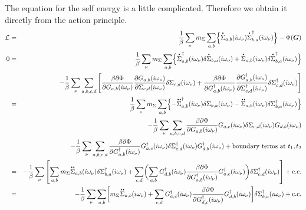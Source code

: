 \documentclass[11pt,a4paper]{report}
\begin{document}
The equation for the self energy is a little complicated. Therefore we
obtain it directly from the action principle.
\begin{eqnarray*}
\mathcal{L}&=&\frac{1}{\beta}\sum_\nu m_\Sigma
\sum_{a,b}\Bigl\lbrace
\dot{\Sigma}_{a,b}(i\omega_\nu)
\dot{\Sigma}^\dagger_{b,a}(i\omega_\nu)\Bigr\rbrace
-\Phi(\mat{G})
\\
0&=&\frac{1}{\beta}\sum_\nu
m_\Sigma\sum_{a,b}\Bigl\lbrace
\dot{\Sigma}_{a,b}^\dagger(i\omega_\nu)
\delta\dot{\Sigma}_{b,a}(i\omega_\nu)
+\dot{\Sigma}_{a,b}(i\omega_\nu)
\delta\dot{\Sigma}_{b,a}^\dagger(i\omega_\nu)
\Bigr\rbrace
\nonumber\\
&&-\frac{1}{\beta}\sum_\nu
\sum_{a,b,c,d}
\left[
\frac{\beta\partial\Phi}{\partial G_{a,b}(i\omega_\nu)}
\frac{\partial G_{a,b}(i\omega_\nu)}{\partial\Sigma_{c,d}(i\omega_\nu)}
\delta\Sigma_{c,d}(i\omega_\nu)
+\frac{\beta\partial\Phi}{\partial G^\dagger_{a,b}(i\omega_\nu)}
\frac{\partial G^\dagger_{a,b}(i\omega_\nu)}
{\partial\Sigma^\dagger_{c,d}(i\omega_\nu)}
\delta\Sigma^\dagger_{c,d}(i\omega_\nu)
\right]
\nonumber\\
%
&=&\frac{1}{\beta}\sum_\nu 
m_\Sigma\sum_{a,b}\Bigl\lbrace
-\ddot{\Sigma}_{a,b}^\dagger(i\omega_\nu)
\delta\Sigma_{b,a}(i\omega_\nu)
-\ddot{\Sigma}_{a,b}(i\omega_\nu)
\delta\Sigma_{b,a}^\dagger(i\omega_\nu)
\Bigr\rbrace
\nonumber\\
&&-\frac{1}{\beta}\sum_\nu
\sum_{a,b,c,d}
\frac{\beta\partial\Phi}{\partial G_{a,b}(i\omega_\nu)}
G_{a,c}(i\omega_\nu)\delta\Sigma_{c,d}(i\omega_\nu)G_{d,b}(i\omega_\nu)
\nonumber\\
&&-\frac{1}{\beta}\sum_\nu
\sum_{a,b,c,d}
\frac{\beta\partial\Phi}{\partial G^\dagger_{a,b}(i\omega_\nu)}
G^\dagger_{a,c}(i\omega_\nu)\delta\Sigma^\dagger_{c,d}(i\omega_\nu)
G^\dagger_{d,b}(i\omega_\nu)
+\text{boundary terms at $t_1,t_2$}
%
\nonumber\\
&=&-\frac{1}{\beta}\sum_\nu 
\left[
\sum_{a,b}
m_\Sigma\ddot{\Sigma}_{a,b}(i\omega_\nu)
\delta\Sigma^\dagger_{b,a}(i\omega_\nu)
+
\sum_{c,d}\biggl(
\sum_{a,b}
G^\dagger_{d,b}(i\omega_\nu)
\frac{\beta\partial\Phi}{\partial G^\dagger_{a,b}(i\omega_\nu)}
G^\dagger_{a,c}(i\omega_\nu)\biggr)
\delta\Sigma^\dagger_{c,d}(i\omega_\nu)\right]+\text{c.c.}
\nonumber\\
%
&=&-\frac{1}{\beta}\sum_\nu \sum_{a,b}
\biggl[m_\Sigma
\ddot{\Sigma}_{a,b}(i\omega_\nu)
+
\sum_{c,d}
G^\dagger_{a,c}(i\omega_\nu)
\frac{\beta\partial\Phi}{\partial G^\dagger_{d,c}(i\omega_\nu)}
G^\dagger_{d,b}(i\omega_\nu)
\biggr]\delta\Sigma^\dagger_{b,a}(i\omega_\nu)+\text{c.c.}
\end{eqnarray*}
\end{document}
